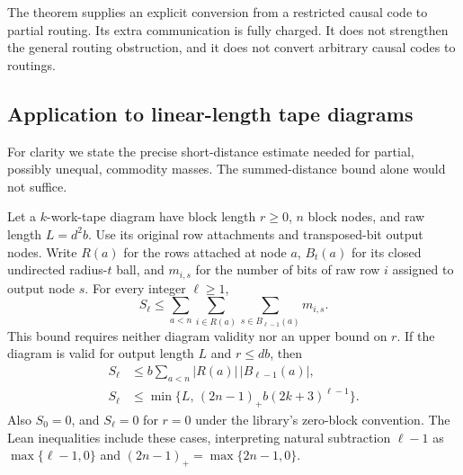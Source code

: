 The theorem supplies an explicit conversion from a restricted causal
code to partial routing.  Its extra communication is fully charged.
It does not strengthen the general routing obstruction, and it does
not convert arbitrary causal codes to routings.

\subsection{Application to linear-length tape diagrams}

For clarity we state the precise short-distance estimate needed for
partial, possibly unequal, commodity masses.  The summed-distance bound
alone would not suffice.

\begin{lemma}\label{lem:attached-short-count}
Let a $k$-work-tape diagram have block length $r\ge0$, $n$ block
nodes, and raw length $L=d^2b$. Use its original row attachments and
transposed-bit output nodes. Write $R(a)$ for the rows attached at node
$a$, $B_t(a)$ for its closed undirected radius-$t$ ball, and $m_{i,s}$
for the number of bits of raw row $i$ assigned to output node $s$.
For every integer $\ell\ge1$,
\begin{equation}\label{eq:attached-short-local}
 S_\ell\le
 \sum_{a<n}\sum_{i\in R(a)}\sum_{s\in B_{\ell-1}(a)}m_{i,s}.
\end{equation}
This bound requires neither diagram validity nor an upper bound on $r$.
If the diagram is valid for output length $L$ and $r\le db$, then
\begin{align}
 S_\ell&\le b\sum_{a<n}|R(a)|\,|B_{\ell-1}(a)|,
     \label{eq:attached-short-profile}\\
 S_\ell&\le\min\{L,\,(2n-1)_+b(2k+3)^{\ell-1}\}.
     \label{eq:attached-short-count}
\end{align}
Also $S_0=0$, and $S_\ell=0$ for $r=0$ under the library's zero-block
convention. The Lean inequalities include these cases, interpreting
natural subtraction $\ell-1$ as $\max\{\ell-1,0\}$ and
$(2n-1)_+=\max\{2n-1,0\}$.
\end{lemma}

